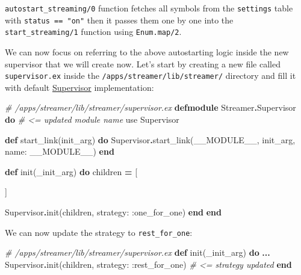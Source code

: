 \documentclass[
]{book}
\newenvironment{Shaded}{\begin{snugshade}}{\end{snugshade}}
\newcommand{\CommentTok}[1]{\textcolor[rgb]{0.56,0.35,0.01}{\textit{#1}}}
\newcommand{\ConstantTok}[1]{\textcolor[rgb]{0.00,0.00,0.00}{#1}}
\newcommand{\ImportTok}[1]{#1}
\newcommand{\KeywordTok}[1]{\textcolor[rgb]{0.13,0.29,0.53}{\textbf{#1}}}
\newcommand{\NormalTok}[1]{#1}
\newcommand{\OperatorTok}[1]{\textcolor[rgb]{0.81,0.36,0.00}{\textbf{#1}}}
\newcommand{\VariableTok}[1]{\textcolor[rgb]{0.00,0.00,0.00}{#1}}
\begin{document}
\texttt{autostart\_streaming/0} function fetches all symbols from the \texttt{settings} table with \texttt{status\ ==\ "on"} then it passes them one by one into the \texttt{start\_streaming/1} function using \texttt{Enum.map/2}.

We can now focus on referring to the above autostarting logic inside the new supervisor that we will create now. Let's start by creating a new file called \texttt{supervisor.ex} inside the \texttt{/apps/streamer/lib/streamer/} directory and fill it with default \href{https://hexdocs.pm/elixir/master/Supervisor.html\#module-module-based-supervisors}{Supervisor} implementation:

\begin{Shaded}
\begin{Highlighting}[]
\CommentTok{\# /apps/streamer/lib/streamer/supervisor.ex}
\KeywordTok{defmodule} \ConstantTok{Streamer}\OperatorTok{.}\ConstantTok{Supervisor} \KeywordTok{do} \CommentTok{\# \textless{}= updated module name}
  \ImportTok{use} \ConstantTok{Supervisor}

  \KeywordTok{def}\NormalTok{ start\_link(init\_arg) }\KeywordTok{do}
    \ConstantTok{Supervisor}\OperatorTok{.}\NormalTok{start\_link(}\ConstantTok{\_\_MODULE\_\_}\NormalTok{, init\_arg, }\VariableTok{name:} \ConstantTok{\_\_MODULE\_\_}\NormalTok{)}
  \KeywordTok{end}

  \KeywordTok{def}\NormalTok{ init(\_init\_arg) }\KeywordTok{do}
\NormalTok{    children }\OperatorTok{=}\NormalTok{ [}

\NormalTok{    ]}

    \ConstantTok{Supervisor}\OperatorTok{.}\NormalTok{init(children, }\VariableTok{strategy:} \VariableTok{:one\_for\_one}\NormalTok{)}
  \KeywordTok{end}
\KeywordTok{end}
\end{Highlighting}
\end{Shaded}

We can now update the strategy to \texttt{rest\_for\_one}:

\begin{Shaded}
\begin{Highlighting}[]
\CommentTok{\# /apps/streamer/lib/streamer/supervisor.ex}
  \KeywordTok{def}\NormalTok{ init(\_init\_arg) }\KeywordTok{do}
    \OperatorTok{...}
    \ConstantTok{Supervisor}\OperatorTok{.}\NormalTok{init(children, }\VariableTok{strategy:} \VariableTok{:rest\_for\_one}\NormalTok{) }\CommentTok{\# \textless{}= strategy updated}
  \KeywordTok{end}
\end{Highlighting}
\end{Shaded}
\end{document}
